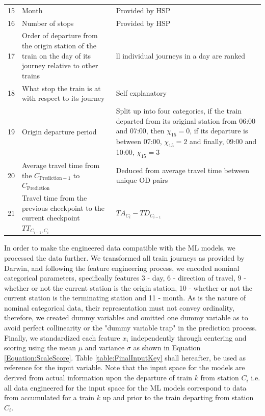 \documentclass[]{interact}
\theoremstyle{plain}%
\theoremstyle{definition}
\theoremstyle{remark}
\begin{document}
\begin{table}[H]
{\begin{tabular}{cp{6cm}p{10cm}}
 15  &  Month  &  Provided by HSP\\ 
 16  &  Number of stops  &  Provided by HSP\\ 
 17  &  Order of departure from the origin station of the train on the day of its journey relative to other trains  &  ll individual journeys in a day are ranked\\ 
 18  &  What stop the train is at with respect to its journey  &  Self explanatory\\ 
 19  &  Origin departure period  &  Split up into four categories, if the train departed from its original station from 06:00 and 07:00, then $\chi_{15}=0$, if its departure is between 07:00, $\chi_{15}=2$ and finally, 09:00 and 10:00, $\chi_{15}=3$\\ 
 20  &  Average travel time from the $C_{\text{Prediction}-1}$ to $C_{\text{Prediction}}$  &  Deduced from average travel time between unique OD pairs\\ 
 21  &  Travel time from the previous checkpoint to the current checkpoint $TT_{C_{i-1},C_{i}}$  &  $TA_{C_i}-TD_{C_{i-1}}$\\
 \bottomrule
\end{tabular}}
\label{InputFeatureTable}
\end{table}

In order to make the engineered data compatible with the ML models, we processed the data further. We transformed all train journeys as provided by Darwin, and following the feature engineering process, we encoded nominal categorical parameters, specifically features 3 - day, 6 - direction of travel, 9 - whether or not the current station is the origin station, 10 - whether or not the current station is the terminating station and 11 - month. As is the nature of nominal categorical data, their representation must not convey ordinality, therefore, we created dummy variables and omitted one dummy variable as to avoid perfect collinearity or the "dummy variable trap" in the prediction process. Finally, we standardized each feature $x_i$ independently through centering and scoring using the mean $\mu$ and variance $\sigma$ as shown in Equation \ref{Equation:ScaleScore}. Table \ref{table:FinalInputKey} shall hereafter, be used as reference for the input variable. Note that the input space for the models are derived from actual information upon the departure of train $k$ from station $C_i$ i.e. all data engineered for the input space for the ML models correspond to data from accumulated for a train $k$ up and prior to the train departing from station $C_i$. 
\end{document}
